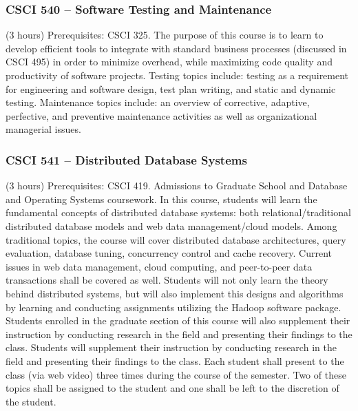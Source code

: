 \subsubsection{CSCI 540 -- Software Testing and Maintenance}
(3 hours) Prerequisites:  CSCI 325. The purpose of this course is to learn to develop efficient tools to integrate with standard business processes (discussed in CSCI 495) in order to minimize overhead, while maximizing code quality and productivity of software projects.  Testing topics include: testing as a requirement for engineering and software design, test plan writing, and static and dynamic testing. Maintenance topics include: an overview of corrective, adaptive, perfective, and preventive maintenance activities as well as organizational managerial issues. 

\subsubsection{CSCI 541 -- Distributed Database Systems}
(3 hours) Prerequisites: CSCI 419.  Admissions to Graduate School and Database and Operating Systems coursework.   In this course, students will learn the fundamental concepts of distributed database systems: both relational/traditional distributed database models and web data management/cloud models. Among traditional topics, the course will cover distributed database architectures, query evaluation, database tuning, concurrency control and cache recovery. Current issues in web data management, cloud computing, and peer-to-peer data transactions shall be covered as well. Students will not only learn the theory behind distributed systems, but will also implement this designs and algorithms by learning and conducting assignments utilizing the Hadoop software package. Students enrolled in the graduate section of this course will also supplement their instruction by conducting research in the field and presenting their findings to the class. Students will supplement their instruction by conducting research in the field and presenting their findings to the class. Each student shall present to the class (via web video) three times during the course of the semester. Two of these topics shall be assigned to the student and one shall be left to the discretion of the student. 

